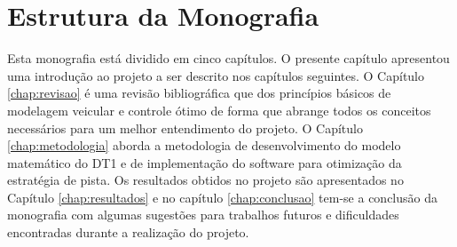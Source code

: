 \section{Estrutura da Monografia}
\label{sec:organizacao}

Esta monografia está dividido em cinco capítulos. O presente capítulo apresentou uma introdução ao projeto a ser descrito nos capítulos seguintes. 
O Capítulo \ref{chap:revisao} é uma revisão bibliográfica que dos princípios básicos de modelagem veicular e controle ótimo de forma que abrange todos os
conceitos necessários para um melhor entendimento do projeto. O Capítulo \ref{chap:metodologia} aborda a metodologia de desenvolvimento do modelo matemático do DT1 e de implementação do software
para otimização da estratégia de pista. Os resultados obtidos no projeto são apresentados no Capítulo \ref{chap:resultados} e no 
capítulo \ref{chap:conclusao} tem-se a conclusão da monografia com algumas sugestões para trabalhos futuros e dificuldades encontradas durante a realização do projeto.

\clearpage